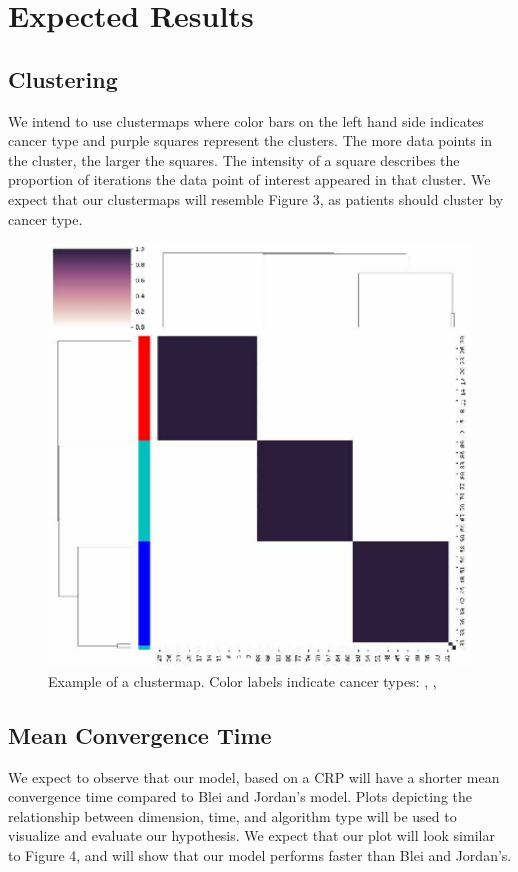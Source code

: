 \documentclass{article}
\begin{document}
\section{Expected Results}
\subsection{Clustering}
We intend to use clustermaps where color bars on the left hand side indicates cancer type and purple squares represent the clusters. The more data points in the cluster, the larger the squares. The intensity of a square describes the proportion of iterations the data point of interest appeared in that cluster. We expect that our clustermaps will resemble Figure 3, as patients should cluster by cancer type.

\begin{figure}[!htp]
	\centering
	\includegraphics[scale=0.3]{figures/example_clustermap.pdf}
	\caption{Example of a clustermap. Color labels indicate cancer types: \color{red}{Type I}, \color{blue}{Type II}, \color{cyan}{Type III}}
\end{figure}


\subsection{Mean Convergence Time}
We expect to observe that our model, based on a CRP will have a shorter mean convergence time compared to Blei and Jordan's model. Plots depicting the relationship between dimension, time, and algorithm type will be used to visualize and evaluate our hypothesis. We expect that our plot will look similar to Figure 4, and will show that our model performs faster than Blei and Jordan's. 
\end{document}
